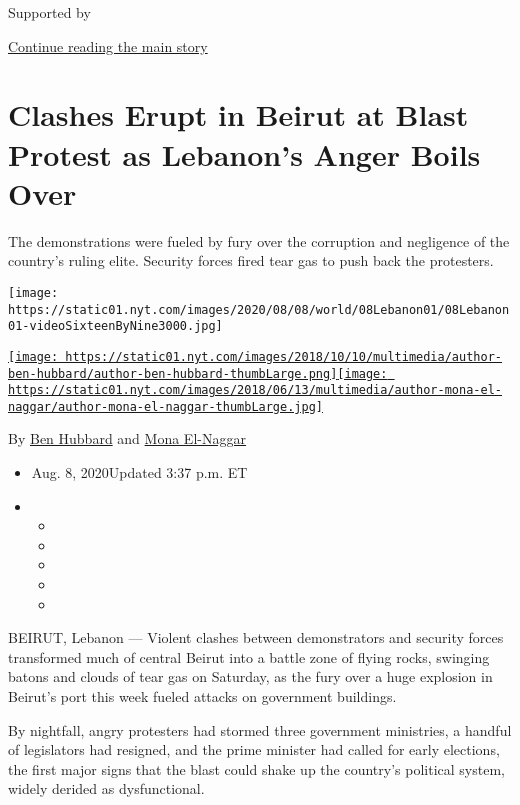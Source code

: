 Supported by

\protect\hyperlink{after-sponsor}{Continue reading the main story}

\hypertarget{clashes-erupt-in-beirut-at-blast-protest-as-lebanons-anger-boils-over}{%
\section{Clashes Erupt in Beirut at Blast Protest as Lebanon's Anger
Boils
Over}\label{clashes-erupt-in-beirut-at-blast-protest-as-lebanons-anger-boils-over}}

The demonstrations were fueled by fury over the corruption and
negligence of the country's ruling elite. Security forces fired tear gas
to push back the protesters.

\texttt{[image: https://static01.nyt.com/images/2020/08/08/world/08Lebanon01/08Lebanon01-videoSixteenByNine3000.jpg]}

\href{https://www.nytimes.com/by/ben-hubbard}{\texttt{[image: https://static01.nyt.com/images/2018/10/10/multimedia/author-ben-hubbard/author-ben-hubbard-thumbLarge.png]}}\href{https://www.nytimes.com/by/mona-el-naggar}{\texttt{[image: https://static01.nyt.com/images/2018/06/13/multimedia/author-mona-el-naggar/author-mona-el-naggar-thumbLarge.jpg]}}

By \href{https://www.nytimes.com/by/ben-hubbard}{Ben Hubbard} and
\href{https://www.nytimes.com/by/mona-el-naggar}{Mona El-Naggar}

\begin{itemize}
\item
  Aug. 8, 2020Updated 3:37 p.m. ET
\item
  \begin{itemize}
  \item
  \item
  \item
  \item
  \item
  \end{itemize}
\end{itemize}

BEIRUT, Lebanon --- Violent clashes between demonstrators and security
forces transformed much of central Beirut into a battle zone of flying
rocks, swinging batons and clouds of tear gas on Saturday, as the fury
over a huge explosion in Beirut's port this week fueled attacks on
government buildings.

By nightfall, angry protesters had stormed three government ministries,
a handful of legislators had resigned, and the prime minister had called
for early elections, the first major signs that the blast could shake up
the country's political system, widely derided as dysfunctional.

